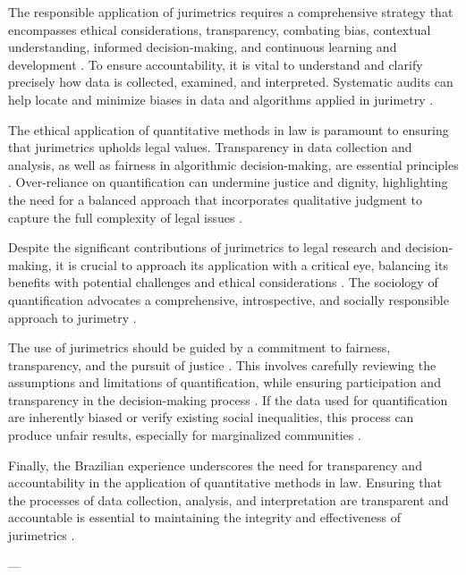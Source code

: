 The responsible application of jurimetrics requires a comprehensive strategy that encompasses ethical considerations, transparency, combating bias, contextual understanding, informed decision-making, and continuous learning and development \cite{10.1590/dados.2022.65.3.267,inthelawviewmetadatacitationsimilarpapers2014}. To ensure accountability, it is vital to understand and clarify precisely how data is collected, examined, and interpreted. Systematic audits can help locate and minimize biases in data and algorithms applied in jurimetry \cite{10.1590/dados.2022.65.3.267,inthelawviewmetadatacitationsimilarpapers2014}.

The ethical application of quantitative methods in law is paramount to ensuring that jurimetrics upholds legal values. Transparency in data collection and analysis, as well as fairness in algorithmic decision-making, are essential principles \cite{internalknowledgesources}. Over-reliance on quantification can undermine justice and dignity, highlighting the need for a balanced approach that incorporates qualitative judgment to capture the full complexity of legal issues \cite{internalknowledgesources}.

Despite the significant contributions of jurimetrics to legal research and decision-making, it is crucial to approach its application with a critical eye, balancing its benefits with potential challenges and ethical considerations \cite{10.1007/s11186-021-09453-1,10.1057/s41599-020-00557-0,10.1590/15174522-105471,10.1590/dados.2022.65.3.267,10.3390/fi9040068,international2015,1023071190721,10.2307/2654208,demortain2019politics,10.5040/9781350220645,10.1080/07329113.2015.1046739,10.1057/s41599-020-0396-5,comptabilitat0018,salais2016quantification,10.1017/s0003975609000150,supiot2018,nunes2016jurimetrics,de2010jurimetrics,zabala2019decades}. The sociology of quantification advocates a comprehensive, introspective, and socially responsible approach to jurimetry \cite{10.1590/dados.2022.65.3.267,salais2016quantification}.

The use of jurimetrics should be guided by a commitment to fairness, transparency, and the pursuit of justice \cite{10.1177/09596801221075807,10.5040/9781350220645}. This involves carefully reviewing the assumptions and limitations of quantification, while ensuring participation and transparency in the decision-making process \cite{10.1590/dados.2022.65.3.267,10.1057/s41599-020-00557-0}. If the data used for quantification are inherently biased or verify existing social inequalities, this process can produce unfair results, especially for marginalized communities \cite{10.1590/dados.2022.65.3.267,10.1057/s41599-020-00557-0}.

Finally, the Brazilian experience underscores the need for transparency and accountability in the application of quantitative methods in law. Ensuring that the processes of data collection, analysis, and interpretation are transparent and accountable is essential to maintaining the integrity and effectiveness of jurimetrics \cite{10.1590/dados.2022.65.3.267,in the lawviewmetadatacitationsimilarpapers2014}.


---

